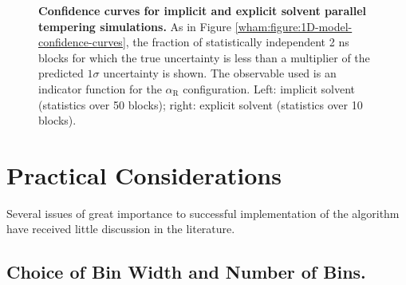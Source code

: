 \begin{figure}[tb]
  \begin{center}
  \end{center}
  \caption{{\bf Confidence curves for implicit and explicit solvent parallel tempering simulations.}  As in Figure \ref{wham:figure:1D-model-confidence-curves}, the fraction of statistically independent 2 ns blocks for which the true uncertainty is less than a multiplier of the predicted $1\sigma$ uncertainty is shown.  The observable used is an indicator function for the $\alpha_\mathrm{R}$ configuration.  Left: implicit solvent (statistics over 50 blocks); right: explicit solvent (statistics over 10 blocks).}
  \label{wham:figure:alanine-dipeptide-confidence-curves}
\end{figure}

\section{Practical Considerations}
\label{wham:section:practical-considerations}

Several issues of great importance to successful implementation of the algorithm have received little discussion in the literature.

\subsection{Choice of Bin Width and Number of Bins.}
\label{wham:section:choice-of-bin-width}

